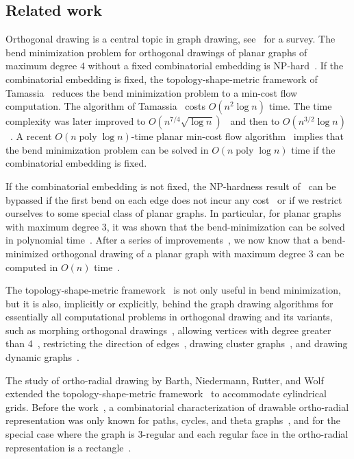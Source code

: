 \documentclass{article}\usepackage[a4paper,margin=20mm]{geometry}
\newcommand{\poly}{\operatorname{poly}}
\begin{document}
\subsection{Related work}
Orthogonal drawing is a central topic in graph drawing, see~\cite{DG13} for a survey. The bend minimization problem for orthogonal drawings of planar graphs of maximum degree $4$ without a fixed combinatorial embedding is NP-hard~\cite{formann1993drawing,GT96}. If the combinatorial embedding is fixed, the topology-shape-metric framework of Tamassia~\cite{tamassia1987embedding} reduces the bend minimization problem to a min-cost flow computation. The algorithm of Tamassia~\cite{tamassia1987embedding} costs $O(n^2 \log n)$ time. The time complexity was later improved to $O\left(n^{7/4} \sqrt{\log n}\right)$~\cite{GT96} and then to $O\left(n^{3/2} \log n\right)$~\cite{CK12}. A recent $O(n \poly \log n)$-time planar min-cost flow algorithm~\cite{dong2022nested} implies that the bend minimization problem can be solved in $O(n \poly \log n)$ time if the combinatorial embedding is fixed.

If the combinatorial embedding is not fixed, the NP-hardness result of~\cite{formann1993drawing,GT96} can be bypassed if the first bend on each edge does not incur any cost~\cite{BRW12} or if we restrict ourselves to some special class of planar graphs. In particular, for planar graphs with maximum degree 3, it was shown that the bend-minimization can be solved in polynomial time~\cite{BLV98}. After a series of improvements~\cite{chang2017bend,didimo2020optimal,didimo2018bend}, we now know that a bend-minimized orthogonal drawing of a planar graph with maximum degree $3$ can be computed in $O(n)$ time~\cite{didimo2020optimal}.

The topology-shape-metric framework~\cite{tamassia1987embedding} is not only useful in bend minimization, but it is also, implicitly or explicitly, behind the graph drawing algorithms for essentially all computational problems in orthogonal drawing and its variants, such as morphing orthogonal drawings~\cite{biedl2013morphing},  allowing vertices with degree greater than 4~\cite{BDPP99,KM98,papakostas2000efficient},  restricting the direction of edges~\cite{didimo2014complexity,durocher2014drawing}, drawing cluster graphs~\cite{brandes2004draw}, and drawing dynamic graphs~\cite{brandes1998dynamic}.

The study of ortho-radial drawing by Barth, Niedermann, Rutter, and Wolf~\cite{barth2023topology} extended the topology-shape-metric framework~\cite{tamassia1987embedding} to accommodate cylindrical grids. Before the work~\cite{barth2023topology}, a combinatorial characterization of drawable ortho-radial representation was only known for paths, cycles, and theta graphs~\cite{hasheminezhad2009ortho}, and for the special case where the graph is 3-regular and each regular face in the ortho-radial representation is a rectangle~\cite{hasheminezhad2010rectangular}.
\end{document}

